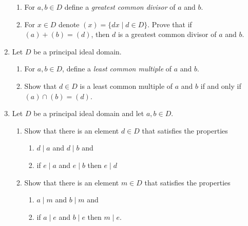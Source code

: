 \documentclass{article}
\theoremstyle{definition}
\begin{document}
\begin{enumerate}
            \begin{enumerate}
                \item For $a,b \in D$ define a \textit{greatest common divisor} of $a$ and $b$.
                \item For $x\in D$ denote $(x)=\{dx \mid  d\in D\}$. Prove that if $(a)+(b)=(d)$, then $d$ is a greatest common divisor of $a$ and $b$.
            \end{enumerate}

            \item Let $D$ be a principal ideal domain.
            
            \begin{enumerate}
                \item For $a,b \in D$, define a \textit{least common multiple} of $a$ and $b$.
                \item Show that $d\in D$ is a least common multiple of $a$ and $b$ if and only if $(a)\cap (b)=(d)$.
            \end{enumerate}

            \item Let $D$ be a principal ideal domain and let $a,b \in D$.
            
            \begin{enumerate}
                \item Show that there is an element $d\in D$ that satisfies the properties 
                
                \begin{enumerate}
                    \item $d\mid a$ and $d\mid b$ and 
                    \item if $e\mid a$ and $e\mid b$ then $e\mid d$
                \end{enumerate}

                \item Show that there is an element $m\in D$ that satisfies the properties
                
                \begin{enumerate}
                    \item $a\mid m$ and $b\mid m$ and 
                    \item if $a\mid e$ and $b\mid e$ then $m\mid e$.
                \end{enumerate}
            \end{enumerate}


\end{enumerate}
\end{document}
